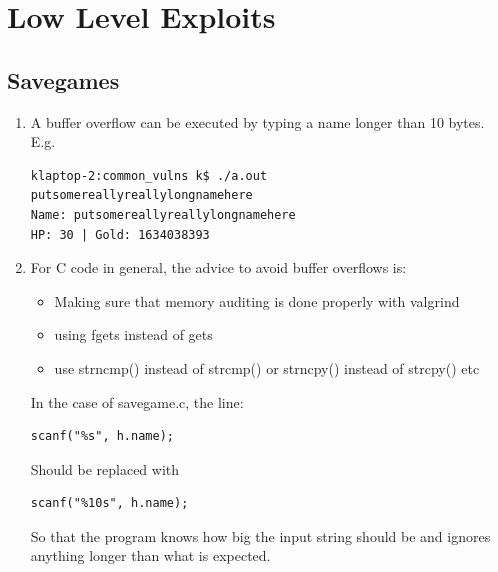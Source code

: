 \documentclass[9pt,a4paper]{article}
\begin{document}
\maketitle
\small
\setlength{\parindent}{0pt}

\section{Low Level Exploits}

\subsection{Savegames}
\begin{enumerate}
\item A buffer overflow can be executed by typing a name longer than 10 bytes.\\
E.g.
\lstset{language=bash}
\begin{lstlisting}
klaptop-2:common_vulns k$ ./a.out
putsomereallyreallylongnamehere
Name: putsomereallyreallylongnamehere
HP: 30 | Gold: 1634038393
\end{lstlisting}

\item For C code in general, the advice to avoid buffer overflows is:
\begin{itemize}
\item Making sure that memory auditing is done properly with valgrind
\item using fgets instead of gets
\item use strncmp() instead of strcmp() or strncpy() instead of strcpy() etc
\end{itemize}

In the case of savegame.c, the line:
\lstset{language=c}
\begin{lstlisting}
scanf("%s", h.name);
\end{lstlisting}
Should be replaced with
\begin{lstlisting}
scanf("%10s", h.name);
\end{lstlisting}
So that the program knows how big the input string should be and ignores anything longer than what is expected.


\end{enumerate}
\end{document}
